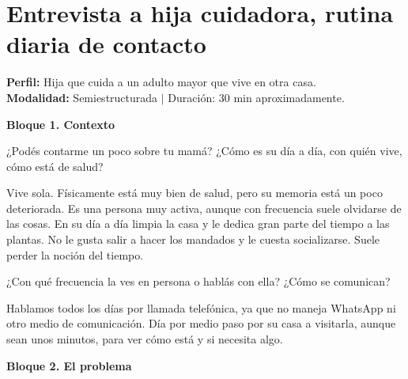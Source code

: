 \label{anexo:entrevistas}

\section{Entrevista a hija cuidadora, rutina diaria de contacto}

\noindent\textbf{Perfil:} Hija que cuida a un adulto mayor que vive en otra casa.\\
\noindent\textbf{Modalidad:} Semiestructurada $|$ Duración: 30 min aproximadamente.

\bigskip
\textbf{Bloque 1. Contexto}

\begin{description}[leftmargin=0cm, labelsep=0.5cm]

    \item[\textbf{Entrevistador:}] ¿Podés contarme un poco sobre tu mamá?
    ¿Cómo es su día a día, con quién vive, cómo está de salud?

    \item[\textbf{Entrevistada:}] Vive sola.
    Físicamente está muy bien de salud, pero su memoria está un poco deteriorada.
    Es una persona muy activa, aunque con frecuencia suele olvidarse de las cosas.
    En su día a día limpia la casa y le dedica gran parte del tiempo a las plantas.
    No le gusta salir a hacer los mandados y le cuesta socializarse.
    Suele perder la noción del tiempo.

    \item[\textbf{Entrevistador:}] ¿Con qué frecuencia la ves en persona o hablás con ella?
    ¿Cómo se comunican?

    \item[\textbf{Entrevistada:}] Hablamos todos los días por llamada telefónica, ya que no maneja WhatsApp ni otro medio de comunicación.
    Día por medio paso por su casa a visitarla, aunque sean unos minutos, para ver cómo está y si necesita algo.

\end{description}

\bigskip
\textbf{Bloque 2. El problema}

